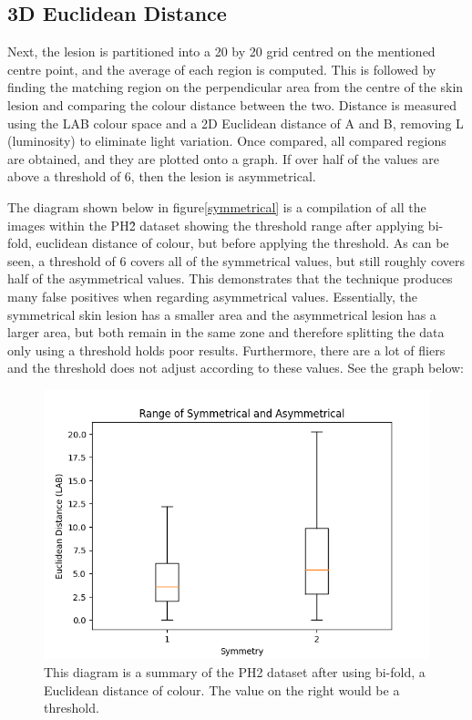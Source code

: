 \subsection{3D Euclidean Distance}
Next, the lesion is partitioned into a 20 by 20 grid centred on the mentioned centre point, and the average of each region is computed. This is followed by finding the matching region on the perpendicular area from the centre of the skin lesion and comparing the colour distance between the two. Distance is measured using the LAB colour space and a 2D Euclidean distance of A and B, removing L (luminosity) to eliminate light variation. Once compared, all compared regions are obtained, and they are plotted onto a graph. If over half of the values are above a threshold of 6, then the lesion is asymmetrical.

The diagram shown below in figure\ref{symmetrical} is a compilation of all the images within the PH\^2 dataset showing the threshold range after applying bi-fold, euclidean distance of colour, but before applying the threshold. As can be seen, a threshold of 6 covers all of the symmetrical values, but still roughly covers half of the asymmetrical values. This demonstrates that the technique produces many false positives when regarding asymmetrical values.
Essentially, the symmetrical skin lesion has a smaller area and the asymmetrical lesion has a larger area, but both remain in the same zone and therefore splitting the data only using a threshold holds poor results. Furthermore, there are a lot of fliers and the threshold does not adjust according to these values. See the graph below:

\begin{figure} 
    \centering
    \includegraphics[scale=0.6]{images/symmetrical.png}
\caption{This diagram is a summary of the PH2 dataset after using bi-fold, a Euclidean distance of colour. The value on the right would be a threshold.}
\end{figure}\label{symmetrical}
    

